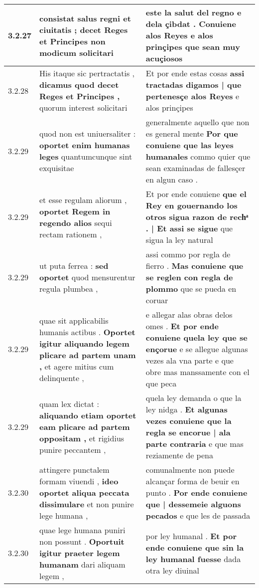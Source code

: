 \begin{tabular}{|p{1cm}|p{6.5cm}|p{6.5cm}|}
3.2.27 & consistat salus regni et ciuitatis ; \textbf{ decet Reges et Principes } non modicum solicitari & este la salut del regno e dela çibdat . \textbf{ Conuiene alos Reyes e alos prinçipes } que sean muy acuçiosos \\\hline
3.2.28 & His itaque sic pertractatis , \textbf{ dicamus quod decet Reges et Principes , } quorum interest solicitari & Et por ende estas cosas \textbf{ assi tractadas digamos | que pertenesçe alos Reyes } e alos prinçipes \\\hline
3.2.29 & quod non est uniuersaliter : \textbf{ oportet enim humanas leges } quantumcunque sint exquisitae & generalmente aquello que non es general mente \textbf{ Por que conuiene que las leyes humanales } commo quier que sean examinadas de fallesçer en algun caso . \\\hline
3.2.29 & et esse regulam aliorum , \textbf{ oportet Regem in regendo alios } sequi rectam rationem , & Et por ende conuiene \textbf{ que el Rey en gouernando los otros sigua razon de rechͣ . | Et assi se sigue } que sigua la ley natural \\\hline
3.2.29 & ut puta ferrea : \textbf{ sed oportet } quod mensurentur regula plumbea , & assi commo por regla de fierro . \textbf{ Mas conuiene que se reglen con regla de plommo } que se pueda en coruar \\\hline
3.2.29 & quae sit applicabilis humanis actibus . \textbf{ Oportet igitur aliquando legem plicare ad partem unam , } et agere mitius cum delinquente , & e allegar alas obras delos omes . \textbf{ Et por ende conuiene quela ley que se ençorue } e se allegue algunas vezes ala vna parte e que obre mas manssamente con el que peca \\\hline
3.2.29 & quam lex dictat : \textbf{ aliquando etiam oportet eam plicare ad partem oppositam , } et rigidius punire peccantem , & quela ley demanda o que la ley nidga . \textbf{ Et algunas vezes conuiene que la regla se encorue | ala parte contraria } e que mas reziamente de pena \\\hline
3.2.30 & attingere punctalem formam viuendi , \textbf{ ideo oportet aliqua peccata dissimulare } et non punire lege humana , & comunalmente non puede alcançar forma de beuir en punto . \textbf{ Por ende conuiene que | dessemeie alguons pecados } e que les de passada \\\hline
3.2.30 & quae lege humana puniri non possunt . \textbf{ Oportuit igitur praeter legem humanam } dari aliquam legem , & por ley humanal . \textbf{ Et por ende conuiene que sin la ley humanal fuesse } dada otra ley diuinal \\\hline

\end{tabular}
